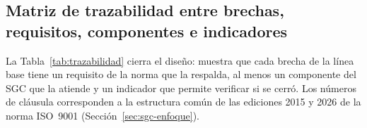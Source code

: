 \subsection{Matriz de trazabilidad entre brechas, requisitos, componentes e indicadores}
\label{sec:sgc-trazabilidad}

La Tabla~\ref{tab:trazabilidad} cierra el diseño: muestra que cada brecha de la línea base tiene un requisito de la norma que la respalda, al menos un componente del SGC que la atiende y un indicador que permite verificar si se cerró. Los números de cláusula corresponden a la estructura común de las ediciones 2015 y 2026 de la norma ISO~9001 (Sección~\ref{sec:sgc-enfoque}).

\begingroup\footnotesize{}\setlength{\tabcolsep}{3pt}
